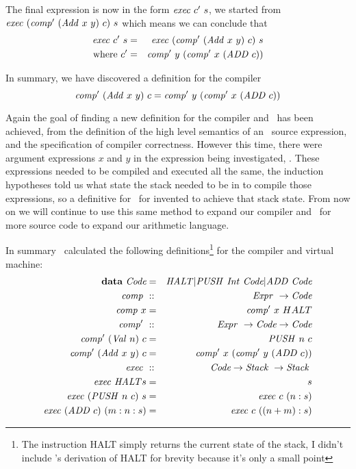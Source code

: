 \documentclass {article}
\begin{document}
The final expression is now in the form
\( \mathit{exec\ } c'\ s \), we started from
\( \mathit{exec\ } (\mathit{comp'\ }  (\mathit{Add\ } x\ y)\ c)\ s \)
which means we can conclude that 
\begin{eqnarray*}
\mathit{exec\ } c'\ s &=& \mathit{exec\ } (\mathit{comp'\ }  (\mathit{Add\ } x\ y)\ c)\ s \\
\mbox{where}\ c' &=& \mathit{comp'\ } y\ (\mathit{comp'\ } x\ (\mathit{ADD\ } c))
\end{eqnarray*}

In summary, we have discovered a definition for the
compiler
\begin{equation*}
\mathit{comp'\ }  (\mathit{Add\ } x\ y)\ c
= \mathit{comp'\ } y\ (\mathit{comp'\ } x\ (\mathit{ADD\ } c))
\end{equation*}

Again the goal of finding a new definition for the
compiler and \vm\ has been achieved,
from the definition of the high level semantics 
of an \add\ source expression, and the specification 
of compiler correctness.
However this time, there were argument expressions
$x$ and $y$ in the expression being investigated, \add.
These expressions needed to be compiled and executed
all the same, the
induction hypotheses told us what state the stack needed
to be in to compile those expressions,
so a definitive for \exec\ for invented to achieve that stack state.
From now on we will continue to use this same method to
expand our compiler and \vm\ for more 
source code to expand our arithmetic language.

\newcommand{\HALTt}{\textit{HALT\ }}
\newcommand{\Stack}{\textit{Stack\ }}
\newcommand{\HALT}{\mathit{HALT}}

In summary \BH\ calculated the following definitions\footnote{
The instruction HALT simply returns the current state of the stack,
I didn't include \BH's derivation of HALT for brevity because
it's only a small point}
for the compiler and virtual machine:
\begin{eqnarray}
	\textbf{data}\  \code &=& \HALT |
			 \PUSH \Int \code | \ADD \code \nonumber \\
	\Comp &::& \Expr \rightarrow \code \nonumber \\
	\Comp x &=& \Compp  x\ HALT \label{comp}\\
	\Compp &::& \Expr \rightarrow \code \rightarrow \code \nonumber \\
	\Compp  (\Val n)\ c &=& \PUSH n\ c \label{compval} \\
	\Compp  (\Add x\ y)\ c 
				&=& \Compp  x\ (\Compp  y\ (\ADD c)) \label{compadd}\\
	\Exec &::& \code  \rightarrow \Stack \rightarrow \Stack \nonumber \\
	\Exec \HALT s &=& s \label{exechalt}\\
	\Exec (\PUSH n\ c)\ s &=& \Exec c\ (n:s) \label{execpush}\\
	\Exec (\ADD c)\ (m:n:s) &=& \Exec c\ ((n + m):s) \label{execadd}
\end{eqnarray}
\end{document}
